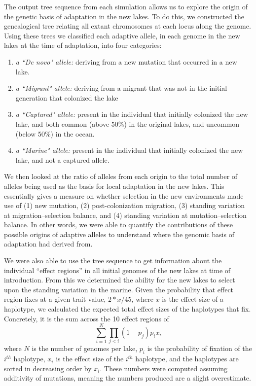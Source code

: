 \documentclass{article}
\begin{document}
The output tree sequence from each simulation allows us to explore the origin of the genetic basis of adaptation in the new lakes. 
To do this, we constructed the genealogical tree relating all extant chromosomes at each locus along the genome.
Using these trees we classified each adaptive allele, in each genome in the new lakes at the time of adaptation, into four categories:
\begin{enumerate}
    \item \emph{a ``De novo" allele:}
        deriving from a new mutation that occurred in a new lake.
    \item \emph{a ``Migrant" allele:} 
        deriving from a migrant that was not in the initial generation that colonized the lake
    \item \emph{a ``Captured" allele:}
        present in the individual that initially colonized the new lake, 
        and both common (above 50\%) in the original lakes,
        and uncommon (below 50\%) in the ocean.
    \item \emph{a ``Marine" allele:} 
        present in the individual that initially colonized the new lake, 
        and not a captured allele.
\end{enumerate}

We then looked at the ratio of alleles from each origin to the total number of alleles being used as the basis for local adaptation in the new lakes.
This essentially gives a measure on whether selection in the new environments made use of
(1) new mutation, 
(2) post-colonization migration, 
(3) standing variation at migration--selection balance, and
(4) standing variation at mutation--selection balance.
In other words, we were able to quantify the contributions of these possible origins 
of adaptive alleles to understand where the genomic basis of adaptation had derived from. 

We were also able to use the tree sequence to get information about the individual ``effect regions''
in all initial genomes of the new lakes at time of introduction.
From this we determined the ability for the new lakes to select upon the standing variation in the marine.
Given the probability that effect region fixes at a given trait value, $2 * x / 45$, where $x$ is the effect size of a haplotype,
we calculated the expected total effect sizes of the haplotypes that fix.
Concretely, it is the sum across the 10 effect regions of
$$\sum_{i=1}^N \prod_{j < i} (1 - p_j) p_i x_i$$
where $N$ is the number of genomes per lake, $p_i$ is the probability of fixation of the 
$i^{th}$ haplotype, $x_{i}$ is the effect size of the $i^{th}$ haplotype, and the haplotypes are sorted in decreasing order by $x_{i}$.
These numbers were computed assuming additivity of mutations, meaning the numbers produced are a slight overestimate.
\end{document}
